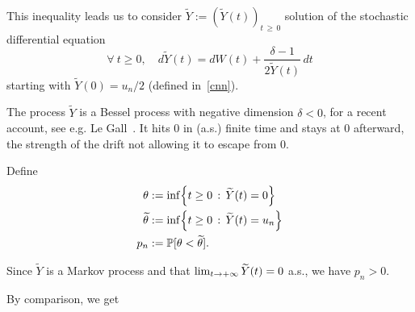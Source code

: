 \documentclass[AHL,Unicode,longabstracts,published]{cedram}
\newcommand{\f}[2]{\frac{#1}{#2}}
\newcommand{\PP}{\mathbb{P}}
\newcommand{\iy}{\infty}
\newcommand{\wi}{\widetilde}
\newcommand{\fo}{\forall\ }
\let\originalleft\left
\let\originalright\right
\renewcommand{\left}{\mathopen{}\mathclose\bgroup\originalleft}
\renewcommand{\right}{\aftergroup\egroup\originalright}
\renewcommand*{\to}{\mathchoice{\longrightarrow}{\rightarrow}{\rightarrow}{\rightarrow}}
\let\oldforall\forall
\renewcommand*{\forall}{\mathrel{\oldforall}}
\begin{document}
This inequality leads us to consider $\wi Y:=(\wi Y(t))_{t\,\geq\,0}$ solution of the stochastic differential equation
\begin{equation}\label{wiY}
\fo t\geq 0,\quad d\wi Y(t) = dW(t)+\f{\delta-1}{2\wi Y(t)}\,dt
\end{equation}
starting with $\wi Y(0)=u_n/2$ (defined in~\eqref{cnn}).

The process $\wi Y$ is a Bessel process with negative dimension $\delta<0$, for a recent account, see e.g. Le Gall~\cite{zbMATH06567615}. It hits 0 in (a.s.) finite time and stays at 0 afterward, the strength of the drift not allowing it to escape from 0.


Define
\begin{equation}\label{pn}
\begin{split}
\theta &:= \inf\left\{t\geq 0\,:\, \wi Y(t)=0\right\}\\
\wi \theta &:= \inf\left\{t\geq 0\,:\, \wi Y(t)=u_n\right\}
\\
p_n &:= \PP[\theta <\wi\theta].
\end{split}
\end{equation}


Since $\wi Y$ is a Markov process and that $\lim_{t\to +\iy}\wi Y(t)=0$ a.s., we have $p_n>0$.


By comparison, we get
\end{document}
